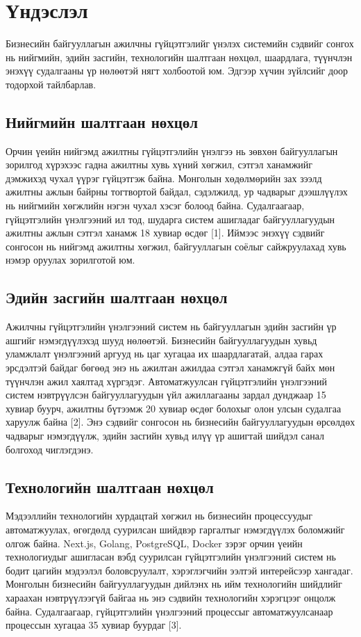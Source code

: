 \section{Үндэслэл}

Бизнесийн байгууллагын ажилчны гүйцэтгэлийг үнэлэх системийн сэдвийг сонгох нь нийгмийн, эдийн засгийн,
технологийн шалтгаан нөхцөл, шаардлага, түүнчлэн энэхүү судалгааны үр нөлөөтэй нягт холбоотой юм. 
Эдгээр хүчин зүйлсийг доор тодорхой тайлбарлав.

\subsection{Нийгмийн шалтгаан нөхцөл}

Орчин үеийн нийгэмд ажилтны гүйцэтгэлийн үнэлгээ нь зөвхөн байгууллагын зорилгод хүрэхээс 
гадна ажилтны хувь хүний хөгжил, сэтгэл ханамжийг дэмжихэд чухал үүрэг гүйцэтгэж байна. 
Монголын хөдөлмөрийн зах зээлд ажилтны ажлын байрны тогтвортой байдал, сэдэлжилд, ур чадварыг 
дээшлүүлэх нь нийгмийн хөгжлийн нэгэн чухал хэсэг болоод байна. Судалгаагаар, гүйцэтгэлийн 
үнэлгээний ил тод, шударга систем ашигладаг байгууллагуудын ажилтны ажлын сэтгэл ханамж 18 
хувиар өсдөг [1]. Иймээс энэхүү сэдвийг сонгосон нь нийгэмд ажилтны хөгжил, байгууллагын 
соёлыг сайжруулахад хувь нэмэр оруулах зорилготой юм.

\subsection{Эдийн засгийн шалтгаан нөхцөл}

Ажилчны гүйцэтгэлийн үнэлгээний систем нь байгууллагын эдийн засгийн үр ашгийг нэмэгдүүлэхэд шууд нөлөөтэй. 
Бизнесийн байгууллагуудын хувьд уламжлалт үнэлгээний аргууд нь цаг хугацаа их шаардлагатай, алдаа 
гарах эрсдэлтэй байдаг бөгөөд энэ нь ажилтан ажилдаа сэтгэл ханамжгүй байх мөн түүнчлэн ажил хаялтад хүргэдэг. 
Автоматжуулсан гүйцэтгэлийн үнэлгээний систем нэвтрүүлсэн байгууллагуудын үйл ажиллагааны зардал дунджаар 15 хувиар буурч, ажилтны бүтээмж 20 хувиар 
өсдөг болохыг олон улсын судалгаа харуулж байна [2]. Энэ сэдвийг сонгосон нь бизнесийн байгууллагуудын 
өрсөлдөх чадварыг нэмэгдүүлж, эдийн засгийн хувьд илүү үр ашигтай шийдэл санал болгоход чиглэгдэнэ.

\subsection{Технологийн шалтгаан нөхцөл}

Мэдээллийн технологийн хурдацтай хөгжил нь бизнесийн процессуудыг автоматжуулах, өгөгдөлд суурилсан шийдвэр 
гаргалтыг нэмэгдүүлэх боломжийг олгож байна. Next.js, Golang, PostgreSQL, Docker зэрэг орчин үеийн технологиудыг 
ашигласан вэбд суурилсан гүйцэтгэлийн үнэлгээний систем нь бодит цагийн мэдээлэл боловсруулалт, хэрэглэгчийн 
ээлтэй интерейсээр хангадаг. Монголын бизнесийн байгууллагуудын дийлэнх нь ийм технологийн 
шийдлийг хараахан нэвтрүүлээгүй байгаа нь энэ сэдвийн технологийн хэрэгцээг онцолж байна. Судалгаагаар, 
гүйцэтгэлийн үнэлгээний процессыг автоматжуулсанаар процессын хугацаа 35 хувиар буурдаг [3].



